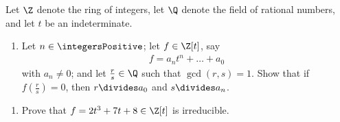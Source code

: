 %
%

\noindent{}Let $\Z$ denote the ring of integers, let $\Q$ denote the field of rational numbers, and let $t$ be an indeterminate.

\begin{enumerate}[label=(\alph*)]
\item Let $n \in \integersPositive$; let $f \in \Z[t]$, say
\begin{align*}
f
=
a_{n} t^{n} + \ldots + a_{0}
\end{align*}
with $a_{n} \neq 0$; and let $\frac{r}{s} \in \Q$ such that $\gcd(r, s) = 1$. Show that if $f(\frac{r}{s}) = 0$, then $r \divides a_{0}$ and $s \divides a_{n}$.
\end{enumerate}

\spaceSolution{3in}{%
}%



\begin{enumerate}[resume, label=(\alph*)]
\item Prove that $f = 2 t^{3} + 7 t + 8 \in \Z[t]$ is irreducible. 
\end{enumerate}

\spaceSolution{3in}{%
}%